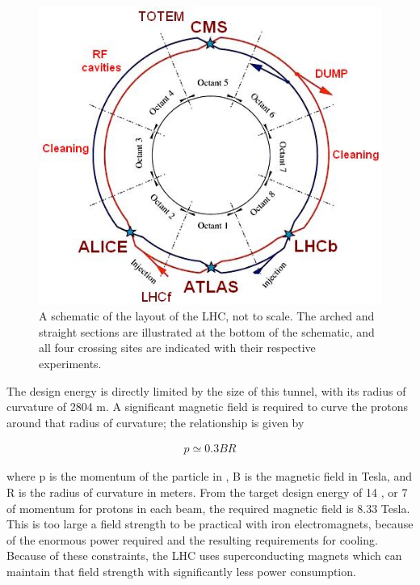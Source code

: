 \begin{figure}
\includegraphics[width=\fullfig]{figures/lhc_schematic.jpg}
\caption{A schematic of the layout of the \ac{LHC}, not to scale. The arched and straight sections are illustrated at the bottom of the schematic, and all four crossing sites are indicated with their respective experiments.}
\label{fig:lhc_schematic}
\end{figure}

The design energy is directly limited by the size of this tunnel, with its radius of curvature of 2804 m. 
A significant magnetic field is required to curve the protons around that radius of curvature; the relationship is given by

\begin{align}
p \simeq 0.3BR \label{eq:magnetic_bending}
\end{align}

\noindent where p is the momentum of the particle in \GeV, B is the magnetic field in Tesla, and R is the radius of curvature in meters. 
From the target design energy of 14 \TeV, or 7 \TeV of momentum for protons in each beam, the required magnetic field is 8.33 Tesla.
This is too large a field strength to be practical with iron electromagnets, because of the enormous power required and the resulting requirements for cooling.
Because of these constraints, the \ac{LHC} uses superconducting magnets which can maintain that field strength with significantly less power consumption.

